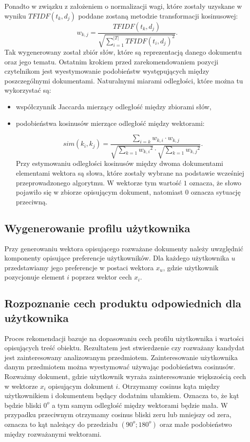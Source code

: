 \documentclass[12pt,a4paper]{report}
\begin{document}
Ponadto w związku z założeniem o normalizacji wagi, które zostały uzyskane w wyniku \begin{math}
TFIDF(t_k, d_j)
\end{math} poddane zostaną metodzie transformacji kosinusowej: 
$$w_{k,j} = \frac{TFIDF(t_k, d_j)}{\sqrt{ \sum_{i=1}^{|T|}{TFIDF(t_i, d_j)}^2}}.$$
Tak wygenerowany został zbiór słów, które są reprezentacją danego dokumentu oraz jego tematu. Ostatnim krokiem przed zarekomendowaniem pozycji czytelnikom jest wyestymowanie podobieństw występujących między poszczególnymi dokumentami. Naturalnymi miarami odległości, które można tu wykorzystać są:
\begin{itemize}
\item współczynnik Jaccarda mierzący odległość między zbiorami słów,
\item podobieństwa kosinusów mierzące odległość między wektorami:

$$
sim(k_i,k_j) = \frac{\sum_{i=k} w_{k,i}\cdot w_{k,j}}{\sqrt{\sum_{k=1}{w_{k,i}}^2} \cdot \sqrt{\sum_{k=1}{w_{k,j}}^2}}.
$$
Przy estymowaniu odległości kosinusów między dwoma dokumentami elementami wektora są słowa, które zostały wybrane na podstawie wcześniej przeprowadzonego algorytmu. W wektorze tym wartość $1$ oznacza, że słowo pojawiło się w zbiorze opisującym dokument, natomiast $0$ oznacza sytuację przeciwną.
\end{itemize}

\subsection{Wygenerowanie profilu użytkownika}
Przy generowaniu wektora opisującego rozważane dokumenty należy uwzględnić komponenty opisujące preferencje użytkowników. Dla każdego użytkownika $u$ przedstawiamy jego preferencje w postaci wektora $x_u$, gdzie użytkownik pozycjonuje element $i$ poprzez wektor cech $x_i$.
\subsection{Rozpoznanie cech produktu odpowiednich dla użytkownika} 
Proces rekomendacji bazuje na dopasowaniu cech profilu użytkownika i wartości opisujących treść obiektu. Rezultatem jest stwierdzenie czy rozważany kandydat jest zainteresowany analizowanym przedmiotem. Zainteresowanie użytkownika danym przedmiotem można wyestymować używając podobieństwa cosinusów. Rozważmy dokument, gdzie użytkownik wyraża zainteresowanie większością cech w wektorze $x_i$ opisującym dokument $i$. Otrzymamy cosinus kąta między użytkownikiem i dokumentem będący dodatnim ułamkiem. Oznacza to, że kąt będzie bliski $0^{o}$ a tym samym odległość między wektorami będzie mała. W przypadku przeciwnym otrzymamy cosinus bliski zeru lub mniejszy od zera, oznacza to kąt należący do przedziału $(90^{o};180^{o})$ oraz małe podobieństwo między rozważanymi wektorami.
\end{document}
